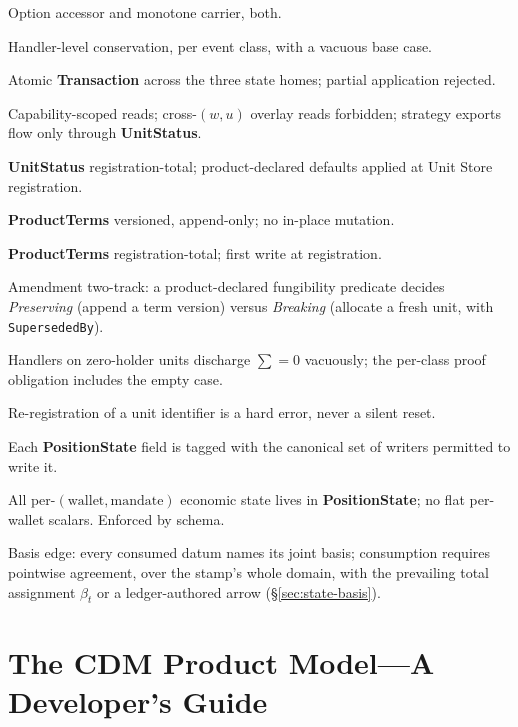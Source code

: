 \documentclass[11pt,a4paper]{article}
\begin{document}
\begin{description}[style=nextline]
\item[C1] Option accessor and monotone carrier, both.
\item[C2] Handler-level conservation, per event class, with a vacuous base case.
\item[C3] Atomic \textbf{Transaction} across the three state homes; partial application rejected.
\item[C4] Capability-scoped reads; cross-$(w,u)$ overlay reads forbidden; strategy exports flow only through \textbf{UnitStatus}.
\item[C5] \textbf{UnitStatus} registration-total; product-declared defaults applied at Unit Store registration.
\item[C6] \textbf{ProductTerms} versioned, append-only; no in-place mutation.
\item[C7] \textbf{ProductTerms} registration-total; first write at registration.
\item[C8] Amendment two-track: a product-declared fungibility predicate decides \emph{Preserving} (append a term version) versus \emph{Breaking} (allocate a fresh unit, with \texttt{SupersededBy}).
\item[C9] Handlers on zero-holder units discharge $\sum=0$ vacuously; the per-class proof obligation includes the empty case.
\item[C10] Re-registration of a unit identifier is a hard error, never a silent reset.
\item[C11] Each \textbf{PositionState} field is tagged with the canonical set of writers permitted to write it.
\item[C12] All per-$(\text{wallet},\text{mandate})$ economic state lives in \textbf{PositionState}; no flat per-wallet scalars. Enforced by schema.
\item[C13] Basis edge: every consumed datum names its joint basis; consumption requires pointwise agreement, over the stamp's whole domain, with the prevailing total assignment $\beta_t$ or a ledger-authored arrow (\S\ref{sec:state-basis}).
\end{description}

\section{The CDM Product Model---A Developer's Guide}
\label{app:cdm-walkthrough}
\end{document}
